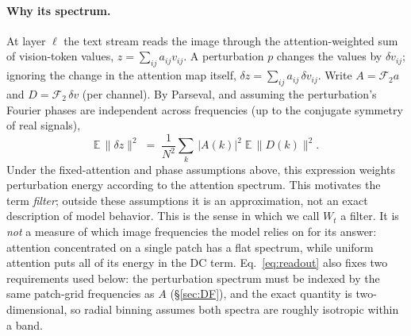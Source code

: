 \documentclass[10pt,twocolumn,letterpaper]{article}
\begin{document}
\paragraph{Why its spectrum.}
At layer $\ell$ the text stream reads the image through the
attention-weighted sum of vision-token values,
$z=\sum_{ij}a_{ij}v_{ij}$. A perturbation $p$ changes the values by
$\delta v_{ij}$; ignoring the change in the attention map itself,
$\delta z=\sum_{ij}a_{ij}\,\delta v_{ij}$. Write $A=\mathcal{F}_2 a$ and
$D=\mathcal{F}_2\,\delta v$ (per channel). By Parseval, and assuming the
perturbation's Fourier phases are independent across frequencies (up to
the conjugate symmetry of real signals),
\begin{equation}
  \mathbb{E}\,\|\delta z\|^2
  \;=\; \frac{1}{N^2}\sum_{k}\,|A(k)|^2\;\mathbb{E}\,\|D(k)\|^2 .
  \label{eq:readout}
\end{equation}
Under the fixed-attention and phase assumptions above, this expression weights perturbation energy according to the attention spectrum. This motivates the term \emph{filter}; outside these assumptions it is an approximation, not an exact description of model behavior. This is
the sense in which we call $W_t$ a filter. It is \emph{not} a measure of
which image frequencies the model relies on for its answer: attention
concentrated on a single patch has a flat spectrum, while uniform
attention puts all of its energy in the DC term. Eq.~\eqref{eq:readout}
also fixes two requirements used below: the perturbation spectrum must
be indexed by the same patch-grid frequencies as $A$ (\S\ref{sec:DF}), and the
exact quantity is two-dimensional, so radial binning assumes both
spectra are roughly isotropic within a band.
\end{document}
